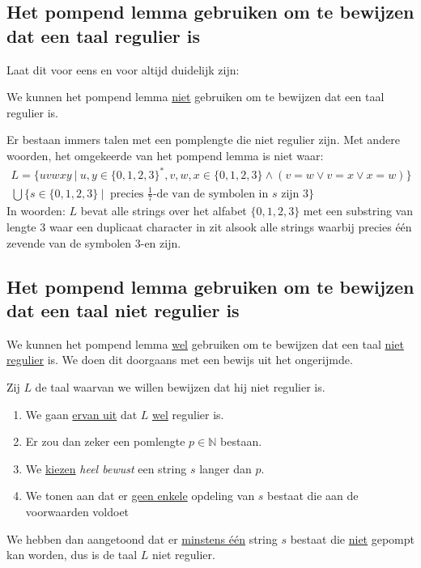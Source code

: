 \documentclass[main.tex]{subfiles}
\begin{document}
\subsection{Het pompend lemma gebruiken om te bewijzen dat een taal regulier is}
Laat dit voor eens en voor altijd duidelijk zijn:
\begin{center}
  We kunnen het pompend lemma \underline{niet} gebruiken om te bewijzen dat een taal regulier is.
\end{center}
Er bestaan immers talen met een pomplengte die niet regulier zijn.
Met andere woorden, het omgekeerde van het pompend lemma is niet waar:
\[ 
\begin{array}{c}
  L = \{ uvwxy\ |\ u,y \in \{0,1,2,3\}^{*}, v,w,x\in \{0,1,2,3\} \wedge (v=w \vee v=x \vee x=w)\}\\
  \bigcup \{ s \in \{0,1,2,3\}\ |\ \text{ precies } \frac{1}{7} \text{-de van de symbolen in } s \text{ zijn } 3 \}  
\end{array}
\]
In woorden: $L$ bevat alle strings over het alfabet $\{0,1,2,3\}$ met een substring van lengte $3$ waar een duplicaat character in zit alsook alle strings waarbij precies \'e\'en zevende van de symbolen $3$-en zijn.

\subsection{Het pompend lemma gebruiken om te bewijzen dat een taal niet regulier is}
We kunnen het pompend lemma \underline{wel} gebruiken om te bewijzen dat een taal \underline{niet regulier} is.
We doen dit doorgaans met een bewijs uit het ongerijmde.

Zij $L$ de taal waarvan we willen bewijzen dat hij niet regulier is.
\begin{enumerate}
\item We gaan \underline{ervan uit} dat $L$ \underline{wel} regulier is.
\item Er zou dan zeker een pomlengte $p\in \mathbb{N}$ bestaan.
\item We \underline{kiezen} \emph{heel bewust} een string $s$ langer dan $p$.
\item We tonen aan dat er \underline{geen enkele} opdeling van $s$ bestaat die aan de voorwaarden voldoet
\end{enumerate}
We hebben dan aangetoond dat er \underline{minstens \'e\'en} string $s$ bestaat die \underline{niet} gepompt kan worden, dus is de taal $L$ niet regulier.
\end{document}
